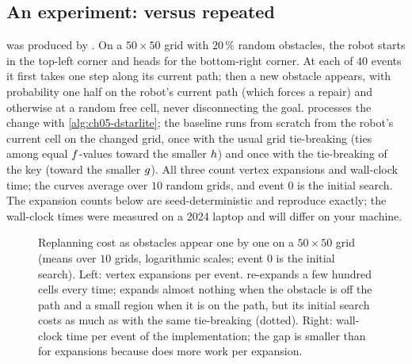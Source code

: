 \subsection{An experiment: \dstarlite versus repeated \astar}
\label{sec:ch05-experiment}

 was produced by .
On a $50 \times 50$ grid with $20\,\%$ random obstacles, the robot starts in the
top-left corner and heads for the bottom-right corner. At each of $40$ events it first
takes one step along its current path; then a new obstacle appears, with probability one
half on the robot's current path (which forces a repair) and otherwise at a random free
cell, never disconnecting the goal. \dstarlite processes the change with
\cref{alg:ch05-dstarlite}; the baseline runs \astar from scratch from the robot's
current cell on the changed grid, once with the usual grid tie-breaking (ties among
equal $f$-values toward the smaller $h$) and once with the tie-breaking of the
\dstarlite key (toward the smaller $g$). All three count vertex expansions and
wall-clock time; the curves average over $10$ random grids, and event $0$ is the initial
search. The expansion counts below are seed-deterministic and reproduce exactly; the
wall-clock times were measured on a 2024 laptop and will differ on your machine.

\begin{figure}[tb]
  \centering
  \caption{Replanning cost as obstacles appear one by one on a $50\times 50$ grid
  (means over $10$ grids, logarithmic scales; event $0$ is the initial search). Left:
  vertex expansions per event. \astar re-expands a few hundred cells every time;
  \dstarlite expands almost nothing when the obstacle is off the path and a small region
  when it is on the path, but its initial search costs as much as \astar with the same
  tie-breaking (dotted). Right: wall-clock time per event of the \python implementation;
  the gap is smaller than for expansions because \dstarlite does more work per
  expansion.}
  \label{fig:ch05-experiment}
\end{figure}

